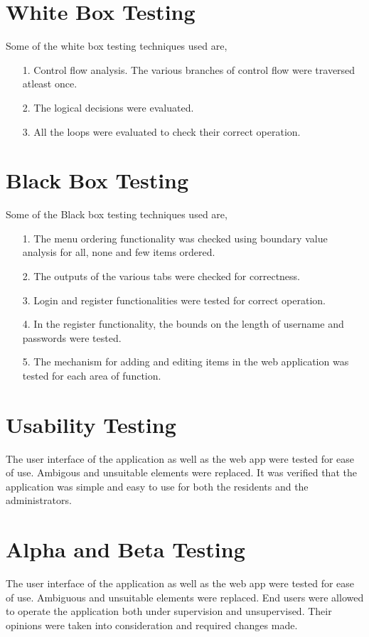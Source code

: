 \section{White Box Testing}
Some of the white box testing techniques used are,

\begin{itemize}
  \item [1.] Control flow analysis. The various branches of control flow were traversed atleast once.
  \item [2.] The logical decisions were evaluated.
  \item [3.] All the loops were evaluated to check their correct operation.
\end{itemize}

\section{Black Box Testing}
Some of the Black box testing techniques used are,

\begin{itemize}
  \item [1.] The menu ordering functionality was checked using boundary value analysis for all, none and few items ordered.
  \item [2.] The outputs of the various tabs were checked for correctness.
  \item [3.] Login and register functionalities were tested for correct operation.
  \item [4.] In the register functionality, the bounds on the length of username and passwords were tested.
  \item [5.] The mechanism for adding and editing items in the web application was tested for each area of function.

\end{itemize}

\section{Usability Testing}
The user interface of the application as well as the web app were tested for ease of use. Ambigous and unsuitable elements were replaced. It was verified that the application was simple and easy to use for both the residents and the administrators.

\section{Alpha and Beta Testing}
The user interface of the application as well as the web app were tested for ease of use. Ambiguous and unsuitable elements were replaced. End users were allowed to operate the application both under supervision and unsupervised. Their opinions were taken into consideration and required changes made. 
